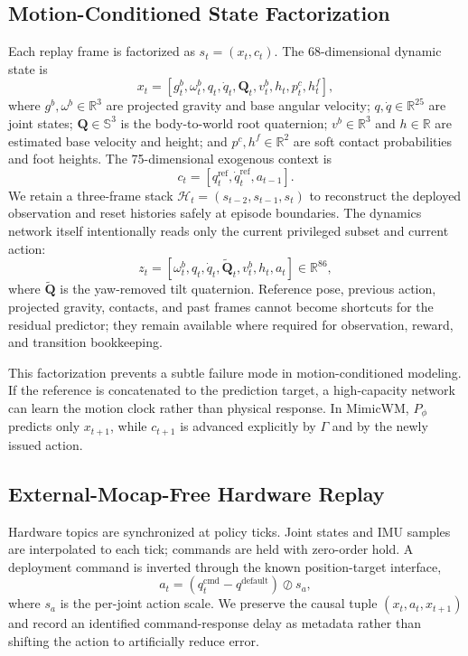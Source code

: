 \documentclass[10pt,twocolumn]{article}
\newcommand{\method}{MimicWM}
\newcommand{\R}{\mathbb{R}}
\newcommand{\quat}{\bm{Q}}
\begin{document}
\subsection{Motion-Conditioned State Factorization}
\label{sec:state}

Each replay frame is factorized as $s_t=(x_t,c_t)$. The 68-dimensional dynamic state is
\begin{equation}
x_t=[g_t^b,\omega_t^b,q_t,\dot q_t,\quat_t,v_t^b,h_t,p_t^c,h_t^f],
\label{eq:dynamic-state}
\end{equation}
where $g^b,\omega^b\in\R^3$ are projected gravity and base angular velocity; $q,\dot q\in\R^{25}$ are joint states; $\quat\in\mathbb{S}^3$ is the body-to-world root quaternion; $v^b\in\R^3$ and $h\in\R$ are estimated base velocity and height; and $p^c,h^f\in\R^2$ are soft contact probabilities and foot heights. The 75-dimensional exogenous context is
\begin{equation}
c_t=[q_t^{\mathrm{ref}},\dot q_t^{\mathrm{ref}},a_{t-1}].
\end{equation}
We retain a three-frame stack $\mathcal{H}_t=(s_{t-2},s_{t-1},s_t)$ to reconstruct the deployed observation and reset histories safely at episode boundaries. The dynamics network itself intentionally reads only the current privileged subset and current action:
\begin{equation}
z_t=[\omega_t^b,q_t,\dot q_t,\widetilde{\quat}_t,v_t^b,h_t,a_t]\in\R^{86},
\label{eq:model-input}
\end{equation}
where $\widetilde{\quat}$ is the yaw-removed tilt quaternion. Reference pose, previous action, projected gravity, contacts, and past frames cannot become shortcuts for the residual predictor; they remain available where required for observation, reward, and transition bookkeeping.

This factorization prevents a subtle failure mode in motion-conditioned modeling. If the reference is concatenated to the prediction target, a high-capacity network can learn the motion clock rather than physical response. In \method{}, $P_\phi$ predicts only $x_{t+1}$, while $c_{t+1}$ is advanced explicitly by $\Gamma$ and by the newly issued action.

\subsection{External-Mocap-Free Hardware Replay}
\label{sec:replay}

Hardware topics are synchronized at policy ticks. Joint states and IMU samples are interpolated to each tick; commands are held with zero-order hold. A deployment command is inverted through the known position-target interface,
\begin{equation}
a_t=(q_t^{\mathrm{cmd}}-q^{\mathrm{default}})\oslash s_a,
\end{equation}
where $s_a$ is the per-joint action scale. We preserve the causal tuple $(x_t,a_t,x_{t+1})$ and record an identified command-response delay as metadata rather than shifting the action to artificially reduce error.
\end{document}
